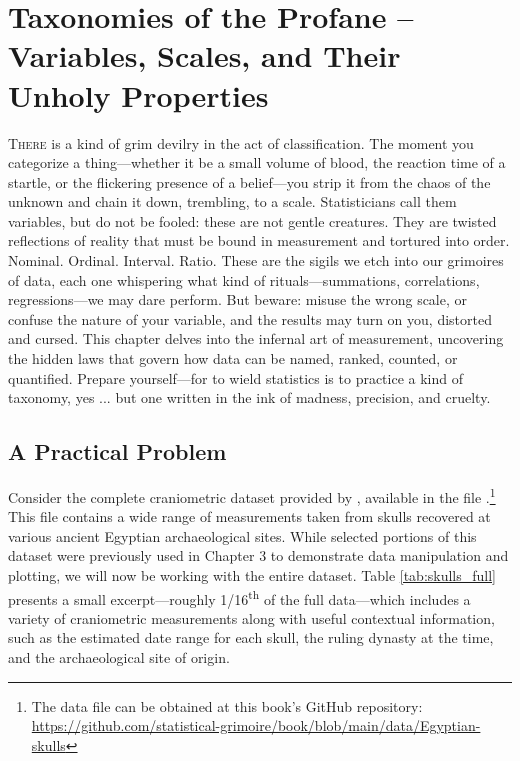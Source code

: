 \chapter{Taxonomies of the Profane – Variables, Scales, and Their Unholy Properties}

\IMFellEnglish
\lettrine[lines=5, realheight]{T}{here} is a kind of grim devilry in the act of classification. The moment you categorize a thing—whether it be a small volume of blood, the reaction time of a startle, or the flickering presence of a belief—you strip it from the chaos of the unknown and chain it down, trembling, to a scale. Statisticians call them variables, but do not be fooled: these are not gentle creatures. They are twisted reflections of reality that must be bound in measurement and tortured into order. Nominal. Ordinal. Interval. Ratio. These are the sigils we etch into our grimoires of data, each one whispering what kind of rituals—summations, correlations, regressions—we may dare perform. But beware: misuse the wrong scale, or confuse the nature of your variable, and the results may turn on you, distorted and cursed. This chapter delves into the infernal art of measurement, uncovering the hidden laws that govern how data can be named, ranked, counted, or quantified. Prepare yourself—for to wield statistics is to practice a kind of taxonomy, yes  ... but one written in the ink of madness, precision, and cruelty.

\normalfont

\section{A Practical Problem}

Consider the complete craniometric dataset provided by  \textcite{Thomson1905}, available in the file .\footnote{The data file can be obtained at this book's GitHub repository: \url{https://github.com/statistical-grimoire/book/blob/main/data/Egyptian-skulls}} This file contains a wide range of measurements taken from skulls recovered at various ancient Egyptian archaeological sites. While selected portions of this dataset were previously used in Chapter 3 to demonstrate data manipulation and plotting, we will now be working with the entire dataset. Table \ref{tab:skulls_full} presents a small excerpt—roughly 1/16\textsuperscript{th} of the full data—which includes a variety of craniometric measurements along with useful contextual information, such as the estimated date range for each skull, the ruling dynasty at the time, and the archaeological site of origin.

